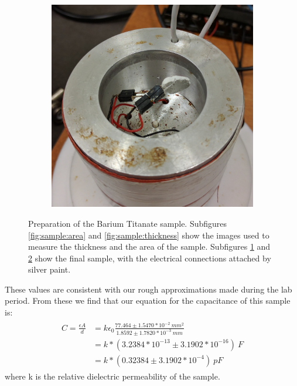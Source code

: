 \documentclass[%
 reprint,
 amsmath,amssymb,
 aps,
 pra,
]{revtex4-1}
\begin{document}
\begin{figure}[H]
\begin{subfigure}{0.22\textwidth}
		\caption{}
		\label{fig:sample:final}
	\end{subfigure}
	\begin{subfigure}{0.22\textwidth}
		\includegraphics[width=\textwidth]{sample_inplace.jpg}
		\caption{}
		\label{fig:sample:inplace}
	\end{subfigure}
	\caption{Preparation of the Barium Titanate sample. Subfigures \ref{fig:sample:area} and \ref{fig:sample:thickness} show the images used to measure the thickness and the area of the sample. Subfigures \ref{fig:sample:final} and \ref{fig:sample:inplace} show the final sample, with the electrical connections attached by silver paint.}
	\label{fig:sample}
\end{figure}

These values are consistent with our rough approximations made during the lab period. From these we find that our equation for the capacitance of this sample is:
\begin{gather}
	\begin{align}
		C = \frac{\epsilon A}{d} & = k \epsilon_0 \frac{77.464 \pm 1.5470*10^{-2} ~mm^2}{1.8592 \pm 1.7820*10^{-3} ~mm} \nonumber \\
		& = k*(3.2384*10^{-13} \pm 3.1902*10^{-16})~F \nonumber \\
		& = k*(0.32384 \pm 3.1902*10^{-4})~pF \nonumber
	\end{align}
\end{gather}
where k is the relative dielectric permeability of the sample. 
\end{document}
